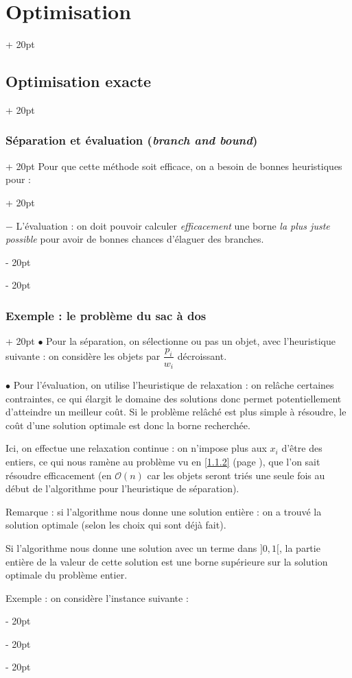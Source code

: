 \documentclass[a4paper, 12pt, twoside]{article}
\newcommand{\ind}[1][20pt]{\advance\leftskip + #1}
\newcommand{\deind}[1][20pt]{\advance\leftskip - #1}
\newenvironment{indt}[2][20pt]{#2 \par \ind[#1]}{\par \deind} %
\newcommand{\1}{\mathbbm 1}
\begin{document}
\begin{indt}{\section{Optimisation}}
\begin{indt}{\subsection{Optimisation exacte}}
\begin{indt}{\subsubsection{Séparation et évaluation (\textit{branch and bound})}}
\begin{indt}{Pour que cette méthode soit efficace, on a besoin de bonnes heuristiques pour :}
                    \vspace{6pt}
                    
                    $-$ L'évaluation : on doit pouvoir calculer \emph{efficacement} une borne \emph{la plus juste possible} pour avoir de bonnes chances d'élaguer des branches.
                \end{indt}
            \end{indt}

            \vspace{12pt}
            
            \begin{indt}{\subsubsection{Exemple : le problème du sac à dos}}
                $\bullet$ Pour la séparation, on sélectionne ou pas un objet, avec l'heuristique suivante : on considère les objets par $\dfrac{p_i}{w_i}$ décroissant.

                \vspace{6pt}
                
                $\bullet$ Pour l'évaluation, on utilise l'heuristique de relaxation : on relâche certaines contraintes, ce qui élargit le domaine des solutions donc permet potentiellement d'atteindre un meilleur coût.
                Si le problème relâché est plus simple à résoudre, le coût d'une solution optimale est donc la borne recherchée.

                Ici, on effectue une relaxation continue : on n'impose plus aux $x_i$ d'être des entiers, ce qui nous ramène au problème vu en \ref{1.1.2} (page \pageref{1.1.2}), que l'on sait résoudre efficacement (en $\mathcal O(n)$ car les objets seront triés une seule fois au début de l'algorithme pour l'heuristique de séparation).

                Remarque : si l'algorithme nous donne une solution entière : on a trouvé la solution optimale (selon les choix qui sont déjà fait).

                Si l'algorithme nous donne une solution avec un terme dans $]0, 1[$, la partie entière de la valeur de cette solution est une borne supérieure sur la solution optimale du problème entier.

                \vspace{12pt}
                
                Exemple : on considère l'instance suivante :


\end{indt}
\end{indt}
\end{indt}
\end{document}
